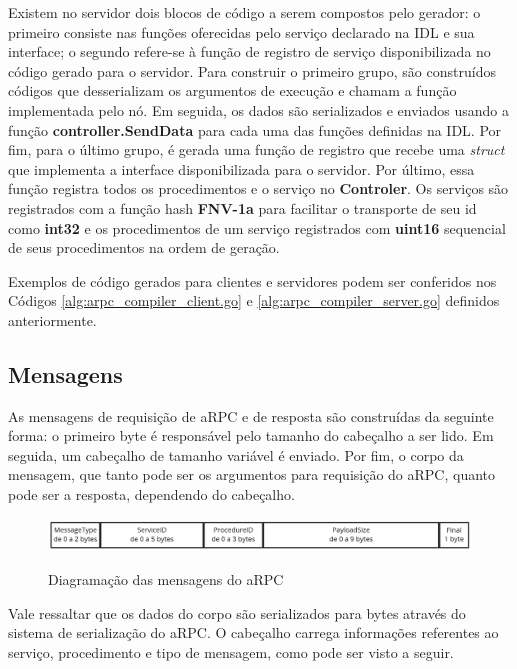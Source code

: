 Existem no servidor dois blocos de código a serem compostos pelo gerador: o primeiro consiste nas funções oferecidas pelo serviço declarado na IDL e sua interface; o segundo refere-se à função de registro de serviço disponibilizada no código gerado para o servidor. Para construir o primeiro grupo, são construídos códigos que desserializam os argumentos de execução e chamam a função implementada pelo nó. Em seguida, os dados são serializados e enviados usando a função \textbf{controller.SendData} para cada uma das funções definidas na IDL. Por fim, para o último grupo, é gerada uma função de registro que recebe uma \textit{struct} que implementa a interface disponibilizada para o servidor. Por último, essa função registra todos os procedimentos e o serviço no \textbf{Controler}. Os serviços são registrados com a função hash \textbf{FNV-1a} para facilitar o transporte de seu id como \textbf{int32} e os procedimentos de um serviço registrados com \textbf{uint16} sequencial de seus procedimentos na ordem de geração. 

Exemplos de código gerados para clientes e servidores podem ser conferidos nos Códigos \ref{alg:arpc_compiler_client.go} e  \ref{alg:arpc_compiler_server.go} definidos anteriormente.

\subsection{Mensagens}

As mensagens de requisição de aRPC e de resposta são construídas da seguinte forma: o primeiro byte é responsável pelo tamanho do cabeçalho a ser lido. Em seguida, um cabeçalho de tamanho variável é enviado. Por fim, o corpo da mensagem, que tanto pode ser os argumentos para requisição do aRPC, quanto pode ser a resposta, dependendo do cabeçalho. 

\begin{figure}[ht]
    \centering
    \caption{Diagramação das mensagens do aRPC}
    \includegraphics[width=\textwidth]{figuras/diagramas/cap3/arpc_message.png} 
    \label{fig:arpc_messages}
\end{figure}

Vale ressaltar que os dados do corpo são serializados para bytes através do sistema de serialização do aRPC. O cabeçalho carrega informações referentes ao serviço, procedimento e tipo de mensagem, como pode ser visto a seguir.

